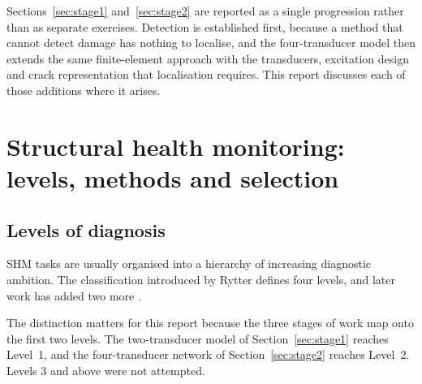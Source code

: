 Sections~\ref{sec:stage1} and~\ref{sec:stage2} are reported as a single progression rather than as separate
exercises. Detection is established first, because a method that cannot detect damage has nothing to
localise, and the four-transducer model then extends the same finite-element approach with the
transducers, excitation design and crack representation that localisation requires. This report discusses
each of those additions where it arises.

\section{Structural health monitoring: levels, methods and selection}
\label{sec:review}

\subsection{Levels of diagnosis}

SHM tasks are usually organised into a hierarchy of increasing diagnostic ambition. The classification
introduced by Rytter defines four levels, and later work has added two more \cite{Rytter1993,Gharehbaghi2021}.

\begin{table}[H]
\centering
\caption{Diagnostic levels in structural health monitoring.}
\label{tab:levels}
\end{table}

The distinction matters for this report because the three stages of work map onto the first two levels. The
two-transducer model of Section~\ref{sec:stage1} reaches Level~1, and the four-transducer network of
Section~\ref{sec:stage2} reaches Level~2. Levels 3 and above were not attempted.

